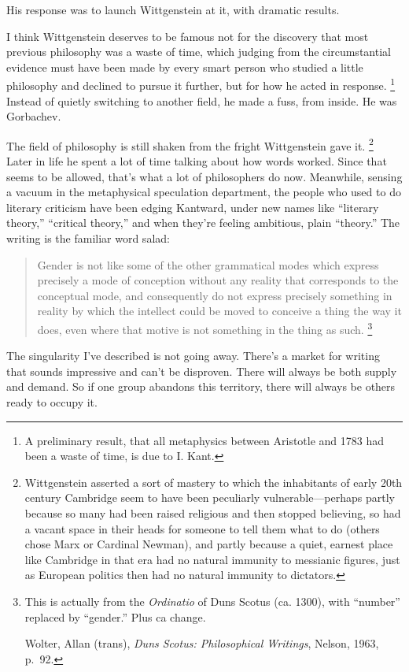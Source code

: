 \documentclass[12pt]{book}
\begin{document}
His response was to launch Wittgenstein at it, with dramatic results.

I think Wittgenstein deserves to be famous not for the discovery that
most previous philosophy was a waste of time, which judging from the
circumstantial evidence must have been made by every smart person who
studied a little philosophy and declined to pursue it further, but for
how he acted in response. \footnote{A preliminary result, that all metaphysics between Aristotle
and 1783 had been a waste of time, is due to I. Kant.} Instead of quietly
switching to another field, he made a fuss, from inside. He was
Gorbachev.

The field of philosophy is still shaken from the fright Wittgenstein
gave it. \footnote{Wittgenstein asserted a sort of mastery to which the
inhabitants of early 20th century Cambridge seem to have been peculiarly
vulnerable---perhaps partly because so many had been raised religious
and then stopped believing, so had a vacant space in their heads for
someone to tell them what to do (others chose Marx or Cardinal Newman),
and partly because a quiet, earnest place like Cambridge in that era had
no natural immunity to messianic figures, just as European politics then
had no natural immunity to dictators.} Later in life he spent a lot of time
talking about how words worked. Since that seems to be allowed, that's
what a lot of philosophers do now. Meanwhile, sensing a vacuum in the
metaphysical speculation department, the people who used to do literary
criticism have been edging Kantward, under new names like ``literary
theory,'' ``critical theory,'' and when they're feeling ambitious, plain
``theory.'' The writing is the familiar word salad:

\begin{quote}
Gender is not like some of the other grammatical modes which express
precisely a mode of conception without any reality that corresponds to
the conceptual mode, and consequently do not express precisely something
in reality by which the intellect could be moved to conceive a thing the
way it does, even where that motive is not something in the thing as
such. \footnote{This is actually from the \emph{Ordinatio} of Duns Scotus (ca.
1300), with ``number'' replaced by ``gender.'' Plus ca change.

Wolter, Allan (trans), \emph{Duns Scotus: Philosophical Writings},
Nelson, 1963, p.~92.}
\end{quote}

The singularity I've described is not going away. There's a market for
writing that sounds impressive and can't be disproven. There will always
be both supply and demand. So if one group abandons this territory,
there will always be others ready to occupy it.
\end{document}
